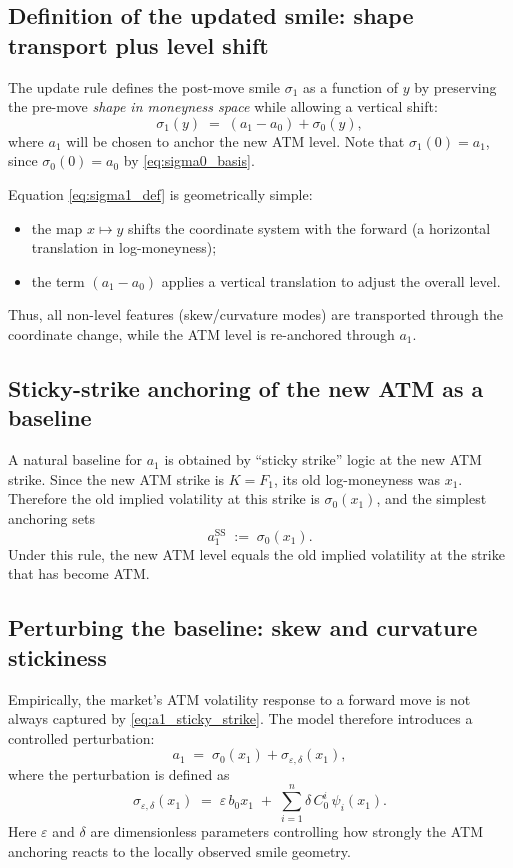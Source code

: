 \documentclass[11pt,a4paper]{report}
\begin{document}
\subsection{Definition of the updated smile: shape transport plus level shift}
The update rule defines the post-move smile $\sigma_1$ as a function of $y$ by preserving the pre-move \emph{shape in moneyness space} while allowing a vertical shift:
\begin{equation}
\sigma_1(y)
\;=\;
(a_1-a_0) + \sigma_0(y),
\label{eq:sigma1_def}
\end{equation}
where $a_1$ will be chosen to anchor the new ATM level.
Note that $\sigma_1(0)=a_1$, since $\sigma_0(0)=a_0$ by \eqref{eq:sigma0_basis}.

Equation \eqref{eq:sigma1_def} is geometrically simple:
\begin{itemize}
\item the map $x \mapsto y$ shifts the coordinate system with the forward (a horizontal translation in log-moneyness);
\item the term $(a_1-a_0)$ applies a vertical translation to adjust the overall level.
\end{itemize}
Thus, all non-level features (skew/curvature modes) are transported through the coordinate change, while the ATM level is re-anchored through $a_1$.

\subsection{Sticky-strike anchoring of the new ATM as a baseline}
A natural baseline for $a_1$ is obtained by ``sticky strike'' logic at the new ATM strike.
Since the new ATM strike is $K=F_1$, its old log-moneyness was $x_1$.
Therefore the old implied volatility at this strike is $\sigma_0(x_1)$, and the simplest anchoring sets
\begin{equation}
a_1^{\mathrm{SS}} \;:=\; \sigma_0(x_1).
\label{eq:a1_sticky_strike}
\end{equation}
Under this rule, the new ATM level equals the old implied volatility at the strike that has become ATM.

\subsection{Perturbing the baseline: skew and curvature stickiness}
Empirically, the market's ATM volatility response to a forward move is not always captured by \eqref{eq:a1_sticky_strike}.
The model therefore introduces a controlled perturbation:
\begin{equation}
a_1
\;=\;
\sigma_0(x_1) + \sigma_{\varepsilon,\delta}(x_1),
\label{eq:a1_perturb}
\end{equation}
where the perturbation is defined as
\begin{equation}
\sigma_{\varepsilon,\delta}(x_1)
\;=\;
\varepsilon\, b_0 x_1
\;+\;
\sum_{i=1}^n \delta\, C_0^{i}\,\psi_i(x_1).
\label{eq:sigma_eps_delta}
\end{equation}
Here $\varepsilon$ and $\delta$ are dimensionless parameters controlling how strongly the ATM anchoring reacts to the locally observed smile geometry.
\end{document}
